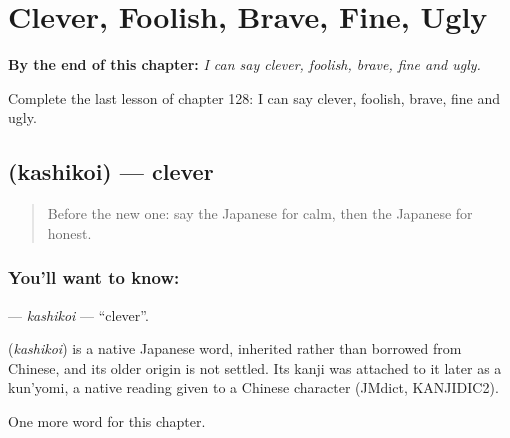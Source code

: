 
\chapter{Clever, Foolish, Brave, Fine, Ugly}
\label{ch:ja-clever-foolish-brave-fine-ugly}

\begin{chapteropening}
\textbf{By the end of this chapter:} \emph{I can say clever, foolish, brave, fine and ugly.}

Complete the last lesson of chapter 128: I can say clever, foolish, brave, fine and ugly.
\end{chapteropening}

\section[\texorpdfstring{\ja{かしこい} (kashikoi)}{かしこい (kashikoi)}]{ (kashikoi) — clever}

\label{lesson:JA-C128-kashikoi}



\begin{quote}
Before the new one: say the Japanese for calm, then the Japanese for honest.
\end{quote}

\subsection*{You'll want to know: }
\textbf{} — \emph{kashikoi} — \textquotedblleft{}clever\textquotedblright{}.

\begin{cousinweb}
\textbf{} (\emph{kashikoi}) is a native Japanese word, inherited rather than borrowed from Chinese, and its older origin is not settled. Its kanji was attached to it later as a kun'yomi, a native reading given to a Chinese character (JMdict, KANJIDIC2).
\end{cousinweb}

\begin{grammarlens}[title={What you've built}]
One more word for this chapter.
\end{grammarlens}

